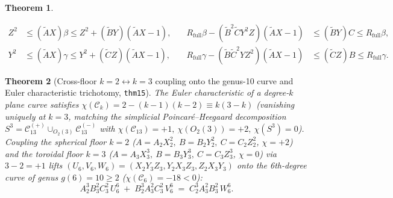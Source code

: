 \documentclass[11pt,a4paper]{article}
\theoremstyle{plain}
\newtheorem{theorem}{Theorem}[section]
\theoremstyle{definition}
\begin{document}
\begin{theorem}
\begin{enumerate}[label=\textbf{(\roman*)},leftmargin=*,noitemsep]
  \begin{equation}
    \label{eq:bilateral-bezout-height-bracket}
    \begin{aligned}
      Z^2 &\le (\widetilde{A}X)\beta \le Z^2 + (\widetilde{B}Y)(\widetilde{A}X - 1), &\quad
      R_{\mathrm{full}}\beta - (\widetilde{B}^2\widetilde{C}Y^2 Z)(\widetilde{A}X - 1) &\le (\widetilde{B}Y)C \le R_{\mathrm{full}}\beta, \\
      Y^2 &\le (\widetilde{A}X)\gamma \le Y^2 + (\widetilde{C}Z)(\widetilde{A}X - 1), &\quad
      R_{\mathrm{full}}\gamma - (\widetilde{B}\widetilde{C}^2 Y Z^2)(\widetilde{A}X - 1) &\le (\widetilde{C}Z)B \le R_{\mathrm{full}}\gamma.
    \end{aligned}
  \end{equation}
\end{enumerate}
\end{theorem}

\begin{theorem}[Cross-floor $k=2 \leftrightarrow k=3$ coupling onto the genus-10 curve and Euler characteristic trichotomy, \texttt{thm15}]
\label{thm:genus-10-thm15}
The Euler characteristic of a degree-$k$ plane curve satisfies $\chi(\mathcal{C}_k) = 2 - (k-1)(k-2) \equiv k(3-k)$ (vanishing uniquely at $k = 3$, matching the simplicial Poincar\'e--Heegaard decomposition $S^3 = \mathcal{C}_{13}^{(+)}\cup_{O_2(3)}\mathcal{C}_{13}^{(-)}$ with $\chi(\mathcal{C}_{13}) = +1,\ \chi(O_2(3)) = +2,\ \chi(S^3) = 0$). Coupling the spherical floor $k=2$ ($A = A_2 X_2^2,\ B = B_2 Y_2^2,\ C = C_2 Z_2^2$, $\chi=+2$) and the toroidal floor $k=3$ ($A = A_3 X_3^3,\ B = B_3 Y_3^3,\ C = C_3 Z_3^3$, $\chi=0$) via $3-2=+1$ lifts $(U_6,V_6,W_6) = (X_2 Y_3 Z_3, Y_2 X_3 Z_3, Z_2 X_3 Y_3)$ onto the 6th-degree curve of genus $g(6) = 10 \ge 2$ ($\chi(\mathcal{C}_6) = -18 < 0$):
\begin{equation}
  \label{eq:genus-10-curve}
  A_2^3 B_3^2 C_3^2\,U_6^6 \;+\; B_2^3 A_3^2 C_3^2\,V_6^6 \;=\; C_2^3 A_3^2 B_3^2\,W_6^6.
\end{equation}
\end{theorem}
\end{document}
